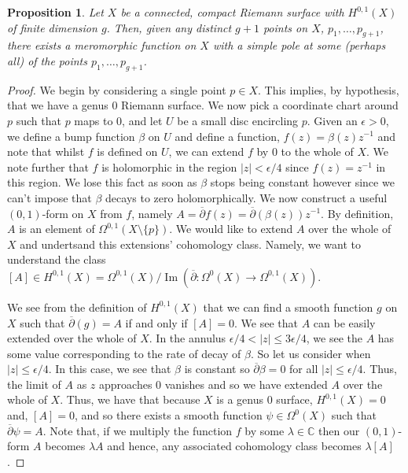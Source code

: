 \documentclass[11pt]{report}
\newtheorem{prop}[thm]{Proposition}
\theoremstyle{definition}
\DeclareMathOperator{\im}{Im}
\begin{document}
\begin{prop}\label{meroFunctionOnGenusGSurface}\label{merofunctions}
  Let $X$ be a connected, compact Riemann surface with $H^{0,1}(X)$ of finite dimension $g$. Then, given any distinct $g+1$ points on $X$, $p_1,\ldots, p_{g+1}$, there exists a meromorphic function on $X$ with a simple pole at some (perhaps all) of the points $p_1,\ldots, p_{g+1}$.
\end{prop} 
\begin{proof}
  We begin by considering a single point $p \in X$. This implies, by hypothesis, that we have a genus $0$ Riemann surface. We now pick a coordinate chart around $p$ such that $p$ maps to $0$, and let $U$ be a small disc encircling $p$. Given an $\epsilon > 0$, we define a bump function $\beta$ on $U$ and define a function, $f(z) = \beta(z)z^{-1}$ and note that whilst $f$ is defined on $U$, we can extend $f$ by $0$ to the whole of $X$. We note further that $f$ is holomorphic in the region $|z| < \epsilon/4$ since $f(z) = z^{-1}$ in this region. We lose this fact as soon as $\beta$ stops being constant however since we can't impose that $\beta$ decays to zero holomorphically. We now construct a useful $(0,1)$-form on $X$ from $f$, namely $A=\overline{\partial}f(z) = \overline{\partial}(\beta(z))z^{-1}$.
  By definition, $A$ is an element of $\Omega^{0,1}(X\setminus \{p\})$. We would like to extend $A$ over the whole of $X$ and undertsand this extensions' cohomology class. Namely, we want to understand the class $[A] \in H^{0,1}(X)=\Omega^{0,1}(X)/\im(\overline{\partial}:\Omega^0(X) \rightarrow \Omega^{0,1}(X))$.

  We see from the definition of $H^{0,1}(X)$ that we can find a smooth function $g$ on $X$ such that $\overline{\partial}(g) = A$ if and only if $[A] = 0$.  We see that $A$ can be easily extended over the whole of $X$. In the annulus $\epsilon /4 < |z| \leq 3\epsilon /4$, we see the $A$ has some value corresponding to the rate of decay of $\beta$. So let us consider when $|z| \leq \epsilon /4$. In this case, we see that $\beta$ is constant so $\overline{\partial}\beta = 0$ for all $|z| \leq \epsilon /4$. Thus, the limit of $A$ as $z$ approaches $0$ vanishes and so we have extended $A$ over the whole of $X$. Thus, we have that because $X$ is a genus $0$ surface, $H^{0,1}(X)=0$ and, $[A] = 0$, and so there exists a smooth function $\psi \in \Omega^0(X)$ such that $\overline{\partial}\psi = A$. Note that, if we multiply the function $f$ by some $\lambda \in \mathbb{C}$ then our $(0,1)$-form $A$ becomes $\lambda A$ and hence, any associated cohomology class becomes $\lambda[A]$.


\end{proof}
\end{document}
